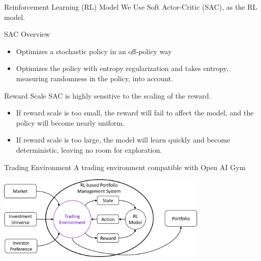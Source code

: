 \begin{frame}{Reinforcement Learning (RL) Model}
We Use Soft Actor-Critic (SAC), as the RL model.
\begin{block}{SAC Overview}
\begin{itemize}
    \item Optimizes a stochastic policy in an off-policy way
    \item Optimizes the policy with \alert{entropy regularization} and takes entropy, measuring randomness in the policy, into account.
\end{itemize}
\end{block}
\begin{alertblock}{Reward Scale}
SAC is highly sensitive to the scaling of the reward. 
\begin{itemize}
    \item If reward scale is too small, the reward will fail to affect the model, and the policy will become nearly uniform.
    \item If reward scale is too large, the model will learn quickly and become deterministic, leaving no room for exploration.
\end{itemize}
\end{alertblock}
\end{frame}



\begin{frame}{Trading Environment}
A trading environment \alert{compatible with Open AI Gym}
\begin{center}
  \includegraphics[width=10cm]{images/trading_environment.png}
\end{center}
\end{frame}

